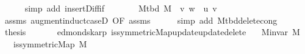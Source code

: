 \begin{isabellebody}
\ \ \ \ \isamarkupfalse%
\ {\isacharparenleft}{\kern0pt}simp\ add{\isacharcolon}{\kern0pt}\ insert{\isacharunderscore}{\kern0pt}Diff{\isacharunderscore}{\kern0pt}if{\isacharparenright}{\kern0pt}\isanewline
\ \ \isamarkupfalse%
\ \isamarkupfalse%
\ {\isachardoublequoteopen}{\isachardot}{\kern0pt}{\isachardot}{\kern0pt}{\isachardot}{\kern0pt}\ {\isacharequal}{\kern0pt}\ M{\isacharunderscore}{\kern0pt}tbd\ M\ {\isacharminus}{\kern0pt}\ {\isacharbraceleft}{\kern0pt}{\isacharbraceleft}{\kern0pt}v{\isacharcomma}{\kern0pt}\ w{\isacharbraceright}{\kern0pt}{\isacharbraceright}{\kern0pt}\ {\isasymunion}\ {\isacharbraceleft}{\kern0pt}{\isacharbraceleft}{\kern0pt}u{\isacharcomma}{\kern0pt}\ v{\isacharbraceright}{\kern0pt}{\isacharbraceright}{\kern0pt}{\isachardoublequoteclose}\isanewline
\ \ \ \ \isamarkupfalse%
\ assms{\isacharparenleft}{\kern0pt}{}{\isacharparenright}{\kern0pt}\ augment{\isacharunderscore}{\kern0pt}induct{\isacharunderscore}{\kern0pt}case{\isacharunderscore}{\kern0pt}{}D{\isacharparenleft}{\kern0pt}{}{}{\isacharcomma}{\kern0pt}\ {}{}{\isacharparenright}{\kern0pt}{\isacharbrackleft}{\kern0pt}OF\ assms{\isacharbrackright}{\kern0pt}\isanewline
\ \ \ \ \isamarkupfalse%
\ {\isacharparenleft}{\kern0pt}simp\ add{\isacharcolon}{\kern0pt}\ M{\isacharunderscore}{\kern0pt}tbd{\isacharunderscore}{\kern0pt}delete{\isacharunderscore}{\kern0pt}cong{\isacharparenright}{\kern0pt}\isanewline
\ \ \isamarkupfalse%
\ \isamarkupfalse%
\ {\isacharquery}{\kern0pt}thesis\isanewline
\ \ \ \ \isacommand{{\isachardot}{\kern0pt}}\isamarkupfalse%
\isanewline
{}\isamarkupfalse%
%
\endisatagproof
{\isafoldproof}%
%
\isadelimproof
\isanewline
%
\endisadelimproof
%
\isadeliminvisible
\isanewline
%
\endisadeliminvisible
%
\isataginvisible
{}\isamarkupfalse%
\ {\isacharparenleft}{\kern0pt}\ edmonds{\isacharunderscore}{\kern0pt}karp{\isacharparenright}{\kern0pt}\ is{\isacharunderscore}{\kern0pt}symmetric{\isacharunderscore}{\kern0pt}Map{\isacharunderscore}{\kern0pt}update{\isacharunderscore}{\kern0pt}update{\isacharunderscore}{\kern0pt}delete{\isacharcolon}{\kern0pt}\isanewline
\ \ \ {\isachardoublequoteopen}M{\isachardot}{\kern0pt}invar\ M{\isachardoublequoteclose}\isanewline
\ \ \ {\isachardoublequoteopen}is{\isacharunderscore}{\kern0pt}symmetric{\isacharunderscore}{\kern0pt}Map\ M{\isachardoublequoteclose}\isanewline

\end{isabellebody}
